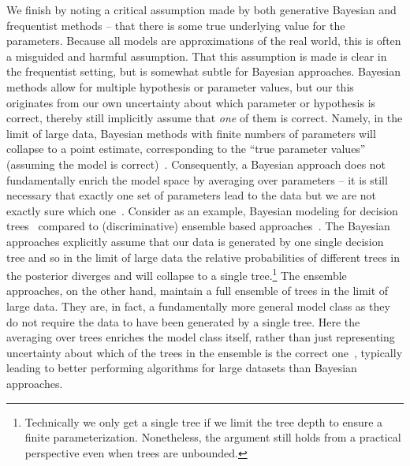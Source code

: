 We finish by noting a critical assumption made by both generative Bayesian and frequentist methods --
that there is some true underlying value for the parameters.  Because
all models are approximations of the real world, this is often a misguided and harmful assumption.  That this assumption
is made is clear in the frequentist setting, but is somewhat subtle for Bayesian approaches.
Bayesian methods allow for multiple hypothesis or parameter values, but our this originates from our own uncertainty
about which parameter or hypothesis is correct, thereby still implicitly assume that \emph{one} of them is correct.
Namely, in the limit of large data, Bayesian methods with finite numbers of parameters will collapse to a point estimate, 
corresponding to the ``true parameter values'' (assuming the model is correct)~\citep{robert2007bayesian}.
Consequently, a Bayesian approach does not fundamentally enrich the model space by averaging over parameters -- it
is still necessary that exactly one set of parameters lead to the data but we are not exactly sure which one~\citep{minka2000bayesian}.
Consider as an example, Bayesian modeling for decision trees~\cite{chipman1998bayesian,lakshminarayanan2013top}
compared to (discriminative) ensemble based approaches~\citep{breiman2001random,rainforth2015canonical}.
The Bayesian approaches explicitly assume that our data is generated by one single decision tree and so in the limit of
large data the relative probabilities of different trees in the posterior diverges and will collapse to a
single tree.\footnote{Technically we only get a single tree 
	if we limit the tree depth to ensure a finite parameterization.  Nonetheless, the argument still
	holds from a practical perspective even when trees are unbounded.}  The ensemble approaches, on the other hand, maintain
a full ensemble of trees in the limit of large data.  They are, in fact, a fundamentally more general model class
as they do not require the data to have been generated by a single tree.  Here the averaging over trees enriches the
model class itself, rather than just representing uncertainty about which of the trees in the ensemble is the correct 
one~\citep{domingos1997does}, typically leading to better performing algorithms for large datasets than Bayesian approaches.